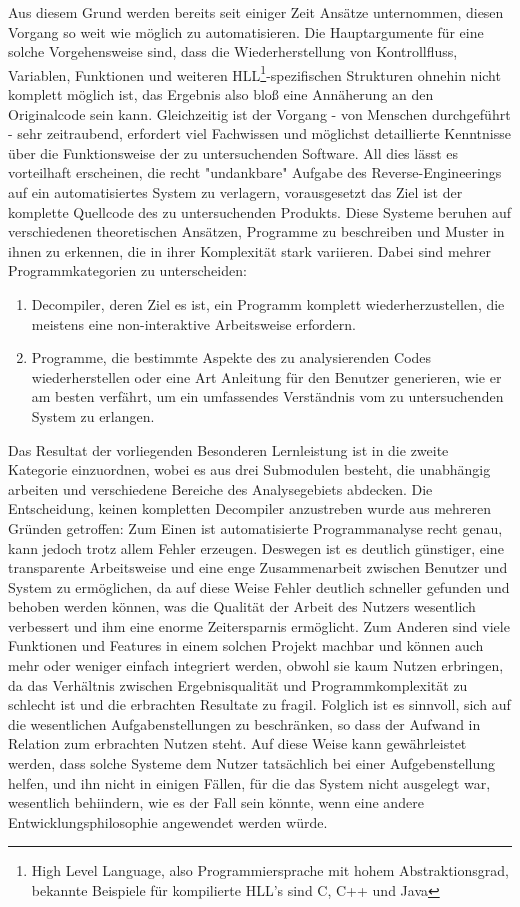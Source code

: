 \documentclass[11pt]{article} %
\begin{document}
Aus diesem Grund
werden bereits seit einiger Zeit Ansätze unternommen, diesen Vorgang so weit wie möglich zu automatisieren.
Die Hauptargumente für eine solche Vorgehensweise sind, dass die Wiederherstellung von Kontrollfluss,
Variablen, Funktionen und weiteren HLL\footnote{High Level Language, also Programmiersprache mit hohem
Abstraktionsgrad, bekannte Beispiele für kompilierte HLL's sind C, C++ und Java}-spezifischen Strukturen
ohnehin nicht komplett möglich ist, das Ergebnis also bloß eine Annäherung an den Originalcode sein kann.
Gleichzeitig ist der Vorgang - von Menschen durchgeführt - sehr zeitraubend, erfordert viel
Fachwissen und möglichst detaillierte Kenntnisse über die Funktionsweise der zu untersuchenden Software.
All dies lässt es vorteilhaft erscheinen, die recht "undankbare" Aufgabe des Reverse-Engineerings auf ein
automatisiertes System zu verlagern, vorausgesetzt das Ziel ist der komplette Quellcode des zu
untersuchenden Produkts. Diese Systeme beruhen auf verschiedenen theoretischen Ansätzen,
Programme zu beschreiben und Muster in ihnen zu erkennen, die in ihrer Komplexität stark variieren.
Dabei sind mehrer Programmkategorien zu unterscheiden:
\begin{enumerate}
	\item{Decompiler, deren Ziel es ist, ein Programm
		komplett wiederherzustellen, die meistens eine non-interaktive Arbeitsweise erfordern.}
	\item{Programme, die bestimmte Aspekte des zu analysierenden Codes wiederherstellen oder eine Art
		Anleitung für den Benutzer generieren, wie er am besten verfährt, um ein umfassendes Verständnis
		vom zu untersuchenden System zu erlangen.}
\end{enumerate}
Das Resultat der vorliegenden Besonderen Lernleistung ist in
die zweite Kategorie einzuordnen, wobei es aus drei Submodulen besteht, die unabhängig arbeiten und
verschiedene Bereiche des Analysegebiets abdecken. Die Entscheidung, keinen kompletten Decompiler
anzustreben wurde aus mehreren Gründen getroffen: Zum Einen ist automatisierte Programmanalyse recht
genau, kann jedoch trotz allem Fehler erzeugen. Deswegen ist es deutlich günstiger, eine
transparente Arbeitsweise und eine enge Zusammenarbeit zwischen Benutzer und System zu ermöglichen,
da auf diese Weise Fehler deutlich schneller gefunden und behoben werden können, was die Qualität
der Arbeit des Nutzers wesentlich verbessert und ihm eine enorme Zeitersparnis ermöglicht. Zum Anderen sind
viele Funktionen und Features in einem solchen Projekt machbar und können auch mehr oder weniger
einfach integriert werden, obwohl sie kaum Nutzen erbringen, da das Verhältnis zwischen
Ergebnisqualität und Programmkomplexität zu schlecht ist und die erbrachten Resultate zu fragil.
Folglich ist es sinnvoll, sich auf die wesentlichen Aufgabenstellungen zu beschränken, so dass
der Aufwand in Relation zum erbrachten Nutzen steht. Auf diese Weise kann gewährleistet werden, dass
solche Systeme dem Nutzer tatsächlich bei einer Aufgebenstellung helfen, und ihn nicht in einigen Fällen,
für die das System nicht ausgelegt war, wesentlich behiindern, wie es der Fall sein könnte, wenn eine
andere Entwicklungsphilosophie angewendet werden würde.
\end{document}

